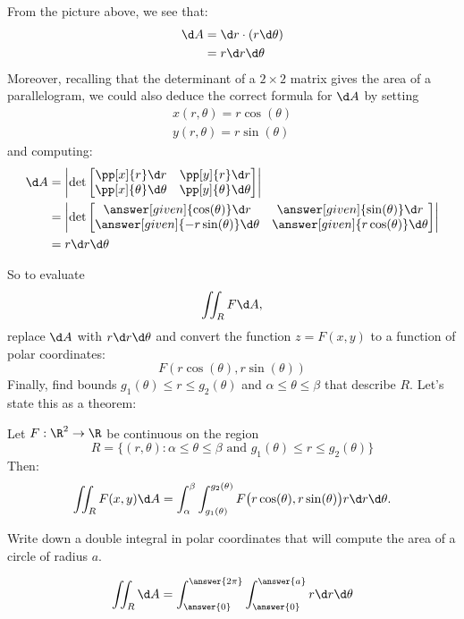 \documentclass{ximera}
\begin{document}
From the picture above, we see that:
\begin{align*}
\d A &= \d r \cdot (r \d \theta) \\
&= r \d r \d \theta
\end{align*}
Moreover, recalling that the determinant of a $2\times 2$ matrix gives
the area of a parallelogram, we could also deduce the correct formula
for $\d A$ by setting
\begin{align*}
  x(r,\theta) = r \cos(\theta)\\
  y(r,\theta) = r \sin(\theta)
\end{align*}
and computing:
\begin{align*}
  \d A &= \left| \det
  \begin{bmatrix}
    \pp[x]{r} \d r & \pp[y]{r} \d r\\
    \pp[x]{\theta} \d \theta & \pp[y]{\theta} \d \theta
  \end{bmatrix}\right|\\
  &= \left| \det
  \begin{bmatrix}
    \answer[given]{\cos(\theta)} \d r & \answer[given]{\sin(\theta)} \d r\\
    \answer[given]{-r\sin(\theta)} \d \theta & \answer[given]{r\cos(\theta)} \d \theta
  \end{bmatrix}\right|\\
  &= r \d r \d \theta
\end{align*}


So to evaluate
\[
\iint_R F\d A,
\]
replace $\d A$ with $r\d r\d\theta$ and convert the function $z=F(x,y)$
to a function of polar coordinates:
\[
F(r\cos(\theta),r\sin(\theta))
\]
Finally, find bounds $g_1(\theta)\leq r\leq g_2(\theta)$ and
$\alpha\leq\theta\leq\beta$ that describe $R$. Let's state this as a
theorem:

\begin{theorem}[Fubini]
  Let $F:\R^2\to\R$ be continuous on the region
  \[
  R=\{(r,\theta):\text{$\alpha\leq\theta\leq\beta$ and $g_1(\theta)\leq r\leq g_2(\theta)$}\}
  \]
  Then: 
  \[
  \iint_R F(x,y)\d A = \int_\alpha^\beta\int_{g_1(\theta)}^{g_2(\theta)} F\big(r\cos(\theta),r\sin(\theta)\big) r\d r\d \theta.
  \]
\end{theorem}

\begin{question}
  Write down a double integral in polar coordinates that will compute
  the area of a circle of radius $a$.
  \begin{prompt}
  \[
  \iint_R \d A = \int_{\answer{0}}^{\answer{2\pi}}
  \int_{\answer{0}}^{\answer{a}}r \d r \d \theta 
  \]
  \end{prompt}
\end{question}
\end{document}
